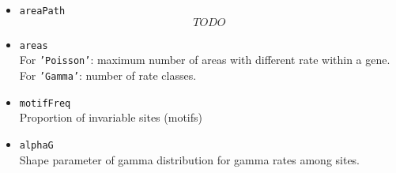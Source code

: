 \documentclass[11pt]{article}
\begin{document}
\begin{itemize}
\item{\texttt{areaPath}} \hfill \\
\[TODO\]
\item{\texttt{areas}} \hfill \\
For \texttt{'Poisson'}: maximum number of areas with different rate within a gene. \hfill \\
For \texttt{'Gamma'}: number of rate classes. \hfill \\
\item{\texttt{motifFreq}} \hfill \\
Proportion of invariable sites (motifs)
\item{\texttt{alphaG}} \hfill \\
Shape parameter of gamma distribution for gamma rates among sites.
\end{itemize}
\end{document}
